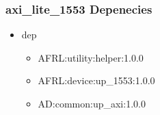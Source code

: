 \subsubsection{axi\_lite\_1553 Depenecies}
\begin{itemize}
\item dep
	\begin{itemize}
	\item AFRL:utility:helper:1.0.0
	\item AFRL:device:up\_1553:1.0.0
	\item AD:common:up\_axi:1.0.0
	\end{itemize}
\end{itemize}
